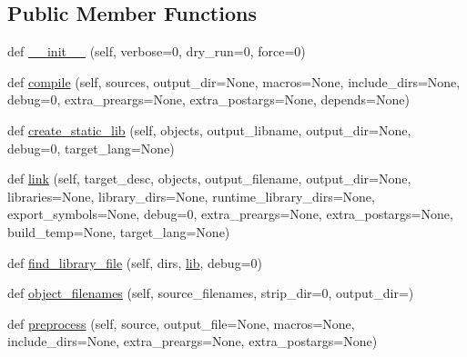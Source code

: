 \subsection*{Public Member Functions}
\begin{DoxyCompactItemize}
\item 
def \hyperlink{classsetuptools_1_1__distutils_1_1bcppcompiler_1_1BCPPCompiler_ad61be5e67672f83f032b030bf9ed0855}{\+\_\+\+\_\+init\+\_\+\+\_\+} (self, verbose=0, dry\+\_\+run=0, force=0)
\item 
def \hyperlink{classsetuptools_1_1__distutils_1_1bcppcompiler_1_1BCPPCompiler_a0bcc35ed8d94b790b4080b431aa900f6}{compile} (self, sources, output\+\_\+dir=None, macros=None, include\+\_\+dirs=None, debug=0, extra\+\_\+preargs=None, extra\+\_\+postargs=None, depends=None)
\item 
def \hyperlink{classsetuptools_1_1__distutils_1_1bcppcompiler_1_1BCPPCompiler_a13640c3e202e4c0d10d0722b033f7472}{create\+\_\+static\+\_\+lib} (self, objects, output\+\_\+libname, output\+\_\+dir=None, debug=0, target\+\_\+lang=None)
\item 
def \hyperlink{classsetuptools_1_1__distutils_1_1bcppcompiler_1_1BCPPCompiler_a6bac28a461d03b04c12b54c98249a420}{link} (self, target\+\_\+desc, objects, output\+\_\+filename, output\+\_\+dir=None, libraries=None, library\+\_\+dirs=None, runtime\+\_\+library\+\_\+dirs=None, export\+\_\+symbols=None, debug=0, extra\+\_\+preargs=None, extra\+\_\+postargs=None, build\+\_\+temp=None, target\+\_\+lang=None)
\item 
def \hyperlink{classsetuptools_1_1__distutils_1_1bcppcompiler_1_1BCPPCompiler_a0ea06707d1886e041ab7a5c33ddce2e4}{find\+\_\+library\+\_\+file} (self, dirs, \hyperlink{classsetuptools_1_1__distutils_1_1bcppcompiler_1_1BCPPCompiler_ae4bdf2778f179247adbe644216677681}{lib}, debug=0)
\item 
def \hyperlink{classsetuptools_1_1__distutils_1_1bcppcompiler_1_1BCPPCompiler_a646e794b91e559f8a620efe1dbb27f00}{object\+\_\+filenames} (self, source\+\_\+filenames, strip\+\_\+dir=0, output\+\_\+dir=\textquotesingle{}\textquotesingle{})
\item 
def \hyperlink{classsetuptools_1_1__distutils_1_1bcppcompiler_1_1BCPPCompiler_a33f9b76bdf19e54e4d3bc8019fa9c4e3}{preprocess} (self, source, output\+\_\+file=None, macros=None, include\+\_\+dirs=None, extra\+\_\+preargs=None, extra\+\_\+postargs=None)
\end{DoxyCompactItemize}
